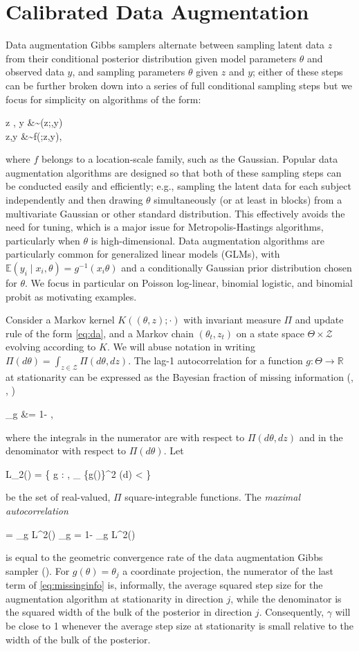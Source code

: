 \documentclass[12pt]{article}
\newcommand{\be}{\begin{equs}}
\newcommand{\ee}{\end{equs}}
\newcommand{\bb}[1]{\mathbb{#1}}
\newcommand{\mc}[1]{\mathcal{#1}}
\DeclareMathOperator{\var}{var}
\begin{document}
\section{Calibrated Data Augmentation} \label{sec:cda}
Data augmentation Gibbs samplers alternate between sampling  latent data $z$ from their conditional posterior distribution given model parameters $\theta$ and observed data $y$, and sampling parameters $\theta$ given $z$ and $y$; either of these steps can be further broken down into a series of full conditional sampling steps but we focus for simplicity on algorithms of the form: 
\be \label{eq:da}
z \mid \theta, y &\sim \pi(z;\theta,y) \\
\theta \mid z,y &\sim f(\theta;z,y),
\ee
where $f$ belongs to a location-scale family, such as the Gaussian.  Popular data augmentation algorithms are designed so that both of these sampling steps can be conducted easily and efficiently; e.g., sampling the latent data for each subject independently and then drawing $\theta$ simultaneously (or at least in blocks) from a multivariate Gaussian or other standard distribution.  This effectively avoids the need for tuning, which is a major issue for Metropolis-Hastings algorithms, particularly when $\theta$ is high-dimensional.
Data augmentation algorithms are particularly common for generalized linear models (GLMs), with $\bb E(y_i \mid x_i, \theta) = g^{-1}(x_i \theta)$ and a conditionally Gaussian prior distribution chosen for $\theta$. We focus in particular on Poisson log-linear, binomial logistic, and binomial probit as motivating examples.

Consider a Markov kernel $K((\theta,z);\cdot)$ with invariant measure $\Pi$ and update rule of the form \eqref{eq:da}, and a Markov chain $(\theta_t,z_t)$ on a state space $\Theta \times \mc Z$ evolving according to $K$. We will abuse notation in writing $\Pi(d\theta) = \int_{z \in \mc Z} \Pi(d\theta,dz)$. The lag-1 autocorrelation for a function $g : \Theta \to \bb R$ at stationarity can be expressed as the Bayesian fraction of missing information (\cite{papaspiliopoulos2007general}, \cite{rubin2004multiple}, \cite{liu1994fraction})
\be
\gamma_g &= 1- \frac{\bb E[\var(g(\theta) \mid z)]}{\var(g(\theta))}, \label{eq:missinginfo}
\ee
where the integrals in the numerator are with respect to $\Pi(d\theta,dz)$ and in the denominator with respect to $\Pi(d\theta)$. Let 
\be
L_2(\Pi) = \left\{ g : \Theta \to \bb R, \int_{\theta \in \Theta} \{g(\theta)\}^2 \Pi(d\theta) < \infty \right\} 
\ee
be the set of real-valued, $\Pi$ square-integrable functions. The \emph{maximal autocorrelation}
\be
\gamma = \sup_{g \in L^2(\Pi)} \gamma_g = 1- \inf_{g \in L^2(\Pi)} \frac{\bb E[\var(g(\theta) \mid z)]}{\var(g(\theta))}
\ee
is equal to the geometric convergence rate of the data augmentation Gibbs sampler (\cite{liu1994fraction}). For $g(\theta) = \theta_j$ a coordinate projection, the numerator of the last term of \eqref{eq:missinginfo} is, informally, the average squared step size for the augmentation algorithm at stationarity in direction $j$, while the denominator is the squared width of the bulk of the posterior in direction $j$. Consequently, $\gamma$ will be close to 1 whenever the average step size at stationarity is small relative to the width of the bulk of the posterior. 
\end{document}
